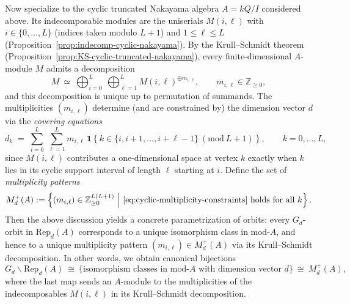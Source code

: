 \documentclass{article}
\theoremstyle{definition}
\begin{document}
Now specialize to the cyclic truncated Nakayama algebra $A=kQ/I$ considered above.
Its indecomposable modules are the uniserials $M(i,\ell)$ with $i\in\{0,\dots,L\}$ (indices taken modulo $L+1$) and $1\le \ell\le L$
(Proposition~\ref{prop:indecomp-cyclic-nakayama}).
By the Krull--Schmidt theorem (Proposition~\ref{prop:KS-cyclic-truncated-nakayama}), every finite-dimensional
$A$-module $M$ admits a decomposition
\[
M\ \simeq\ \bigoplus_{i=0}^{L}\ \bigoplus_{\ell=1}^{L} M(i,\ell)^{\oplus m_{i,\ell}},
\qquad m_{i,\ell}\in\mathbb{Z}_{\ge 0},
\]
and this decomposition is unique up to permutation of summands.
The multiplicities $(m_{i,\ell})$ determine (and are constrained by) the dimension vector $d$ via the \emph{covering equations}
\begin{equation}\label{eq:cyclic-multiplicity-constraints}
d_k \;=\; \sum_{i=0}^{L}\ \sum_{\ell=1}^{L} m_{i,\ell}\,\mathbf{1}\!\left\{k\in\{i,i+1,\dots,i+\ell-1\}\ (\mathrm{mod}\ L+1)\right\},
\qquad k=0,\dots,L,
\end{equation}
since $M(i,\ell)$ contributes a one-dimensional space at vertex $k$ exactly when $k$ lies in its cyclic
support interval of length $\ell$ starting at $i$.
Define the set of \emph{multiplicity patterns}
\[
M_d^{+}(A)
:=\left\{(m_{i,\ell})\in \mathbb{Z}_{\ge 0}^{L(L+1)}\ \middle|\ \text{\eqref{eq:cyclic-multiplicity-constraints} holds for all }k\right\}.
\]
Then the above discussion yields a concrete parametrization of orbits:
every $G_d$-orbit in $\mathrm{Rep}_d(A)$ corresponds to a unique isomorphism class in $\mathrm{mod}\text{-}A$,
and hence to a unique multiplicity pattern $(m_{i,\ell})\in M_d^{+}(A)$ via its Krull--Schmidt decomposition.
In other words, we obtain canonical bijections
\[
G_d\backslash \mathrm{Rep}_d(A)
\ \cong\
\Big\{\text{isomorphism classes in $\mathrm{mod}\text{-}A$ with dimension vector $d$}\Big\}
\ \cong\
M_d^{+}(A),
\]
where the last map sends an $A$-module to the multiplicities of the indecomposables $M(i,\ell)$ in its Krull--Schmidt decomposition.
\end{document}
